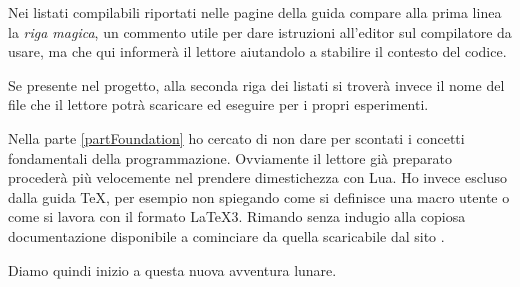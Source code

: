 Nei listati compilabili riportati nelle pagine della guida compare alla prima
linea la \emph{riga magica}, un commento utile per dare istruzioni all'editor
sul compilatore da usare, ma che qui informerà il lettore aiutandolo a stabilire
il contesto del codice.

Se presente nel progetto, alla seconda riga dei listati si troverà invece il
nome del file che il lettore potrà scaricare ed eseguire per i propri
esperimenti.

Nella parte \ref{partFoundation} ho cercato di non dare per scontati i concetti
fondamentali della programmazione. Ovviamente il lettore già preparato procederà
più velocemente nel prendere dimestichezza con Lua. Ho invece escluso dalla
guida \TeX{}, per esempio non spiegando come si definisce una macro utente o
come si lavora con il formato \LaTeX3. Rimando senza indugio alla copiosa
documentazione disponibile a cominciare da quella scaricabile dal sito \GuIT.

Diamo quindi inizio a questa nuova avventura lunare.

